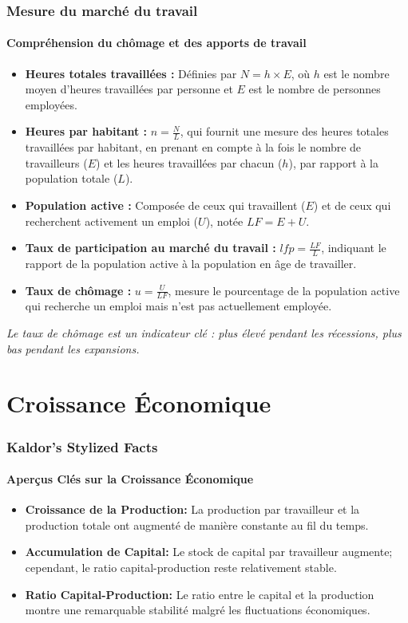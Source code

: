 \documentclass{beamer}
\begin{document}
\begin{frame}
    \frametitle{Mesure du marché du travail}
    \framesubtitle{Compréhension du chômage et des apports de travail}

    \begin{itemize}
        \item \textbf{Heures totales travaillées :} Définies par \( N = h \times E \), où \( h \) est le nombre moyen d'heures travaillées par personne et \( E \) est le nombre de personnes employées.
        \pause
        \item \textbf{Heures par habitant :} \( n = \frac{N}{L} \), qui fournit une mesure des heures totales travaillées par habitant, en prenant en compte à la fois le nombre de travailleurs (\( E \)) et les heures travaillées par chacun (\( h \)), par rapport à la population totale (\( L \)).
        \pause
        \item \textbf{Population active :} Composée de ceux qui travaillent (\( E \)) et de ceux qui recherchent activement un emploi (\( U \)), notée \( LF = E + U \).
        \pause
        \item \textbf{Taux de participation au marché du travail :} \( lfp = \frac{LF}{L} \), indiquant le rapport de la population active à la population en âge de travailler.
        \pause
        \item \textbf{Taux de chômage :} \( u = \frac{U}{LF} \), mesure le pourcentage de la population active qui recherche un emploi mais n'est pas actuellement employée.
    \end{itemize}
    \textit{Le taux de chômage est un indicateur clé : plus élevé pendant les récessions, plus bas pendant les expansions.}
\end{frame}

\section*{Croissance Économique}

    
\begin{frame}
    \frametitle{Kaldor's Stylized Facts}
    \hypertarget{kaldor}{} %
    \framesubtitle{Aperçus Clés sur la Croissance Économique}
        \begin{itemize}
            \item \textbf{Croissance de la Production:} 
            La production par travailleur et la production totale ont augmenté de 
            manière constante au fil du temps.
            \hyperlink{growth}{}
            \item \textbf{Accumulation de Capital:} 
            Le stock de capital par travailleur augmente; cependant, le ratio 
            capital-production reste relativement stable.
            \hyperlink{capital}{}
            \item \textbf{Ratio Capital-Production:}
            Le ratio entre le capital et la production 
            montre une remarquable stabilité malgré les fluctuations 
            économiques.
            \hyperlink{capital_output_ratio}{}
        \end{itemize}
\end{frame}
\end{document}
